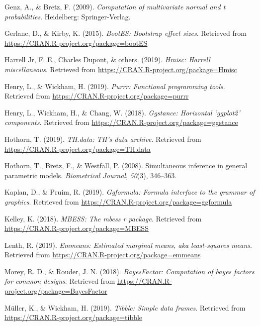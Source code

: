 \documentclass[man]{apa6}
\begin{document}
\leavevmode\hypertarget{ref-R-mvtnorm}{}%
Genz, A., \& Bretz, F. (2009). \emph{Computation of multivariate normal and t probabilities}. Heidelberg: Springer-Verlag.

\leavevmode\hypertarget{ref-R-bootES}{}%
Gerlanc, D., \& Kirby, K. (2015). \emph{BootES: Bootstrap effect sizes}. Retrieved from \url{https://CRAN.R-project.org/package=bootES}

\leavevmode\hypertarget{ref-R-Hmisc}{}%
Harrell Jr, F. E., Charles Dupont, \& others. (2019). \emph{Hmisc: Harrell miscellaneous}. Retrieved from \url{https://CRAN.R-project.org/package=Hmisc}

\leavevmode\hypertarget{ref-R-purrr}{}%
Henry, L., \& Wickham, H. (2019). \emph{Purrr: Functional programming tools}. Retrieved from \url{https://CRAN.R-project.org/package=purrr}

\leavevmode\hypertarget{ref-R-ggstance}{}%
Henry, L., Wickham, H., \& Chang, W. (2018). \emph{Ggstance: Horizontal 'ggplot2' components}. Retrieved from \url{https://CRAN.R-project.org/package=ggstance}

\leavevmode\hypertarget{ref-R-TH.data}{}%
Hothorn, T. (2019). \emph{TH.data: TH's data archive}. Retrieved from \url{https://CRAN.R-project.org/package=TH.data}

\leavevmode\hypertarget{ref-R-multcomp}{}%
Hothorn, T., Bretz, F., \& Westfall, P. (2008). Simultaneous inference in general parametric models. \emph{Biometrical Journal}, \emph{50}(3), 346--363.

\leavevmode\hypertarget{ref-R-ggformula}{}%
Kaplan, D., \& Pruim, R. (2019). \emph{Ggformula: Formula interface to the grammar of graphics}. Retrieved from \url{https://CRAN.R-project.org/package=ggformula}

\leavevmode\hypertarget{ref-R-MBESS}{}%
Kelley, K. (2018). \emph{MBESS: The mbess r package}. Retrieved from \url{https://CRAN.R-project.org/package=MBESS}

\leavevmode\hypertarget{ref-R-emmeans}{}%
Lenth, R. (2019). \emph{Emmeans: Estimated marginal means, aka least-squares means}. Retrieved from \url{https://CRAN.R-project.org/package=emmeans}

\leavevmode\hypertarget{ref-R-BayesFactor}{}%
Morey, R. D., \& Rouder, J. N. (2018). \emph{BayesFactor: Computation of bayes factors for common designs}. Retrieved from \url{https://CRAN.R-project.org/package=BayesFactor}

\leavevmode\hypertarget{ref-R-tibble}{}%
Müller, K., \& Wickham, H. (2019). \emph{Tibble: Simple data frames}. Retrieved from \url{https://CRAN.R-project.org/package=tibble}
\end{document}
